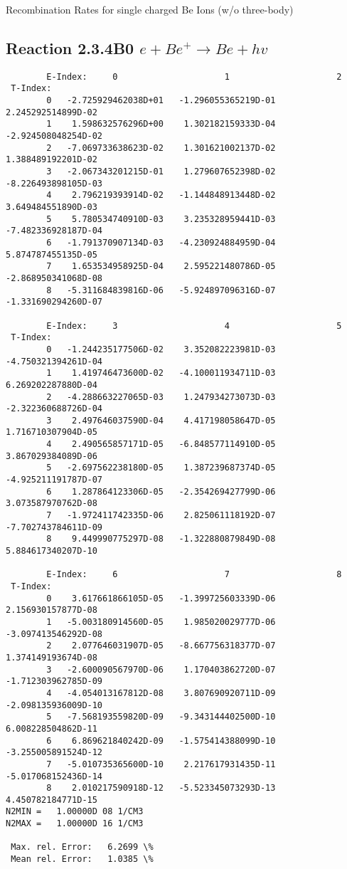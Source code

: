 \documentclass[12pt,dvipdfmx]{article}
\begin{document}
  Recombination Rates for single charged Be Ions (w/o three-body)

\subsection{
Reaction 2.3.4B0  $e + Be^+ \rightarrow Be + hv$
}


\begin{small}\begin{verbatim}
        E-Index:     0                     1                     2
 T-Index:
        0   -2.725929462038D+01   -1.296055365219D-01    2.245292514899D-02
        1    1.598632576296D+00    1.302182159333D-04   -2.924508048254D-02
        2   -7.069733638623D-02    1.301621002137D-02    1.388489192201D-02
        3   -2.067343201215D-01    1.279607652398D-02   -8.226493898105D-03
        4    2.796219393914D-02   -1.144848913448D-02    3.649484551890D-03
        5    5.780534740910D-03    3.235328959441D-03   -7.482336928187D-04
        6   -1.791370907134D-03   -4.230924884959D-04    5.874787455135D-05
        7    1.653534958925D-04    2.595221480786D-05   -2.868950341068D-08
        8   -5.311684839816D-06   -5.924897096316D-07   -1.331690294260D-07

        E-Index:     3                     4                     5
 T-Index:
        0   -1.244235177506D-02    3.352082223981D-03   -4.750321394261D-04
        1    1.419746473600D-02   -4.100011934711D-03    6.269202287880D-04
        2   -4.288663227065D-03    1.247934273073D-03   -2.322360688726D-04
        3    2.497646037590D-04    4.417198058647D-05    1.716710307904D-05
        4    2.490565857171D-05   -6.848577114910D-05    3.867029384089D-06
        5   -2.697562238180D-05    1.387239687374D-05   -4.925211191787D-07
        6    1.287864123306D-05   -2.354269427799D-06    3.073587970762D-08
        7   -1.972411742335D-06    2.825061118192D-07   -7.702743784611D-09
        8    9.449990775297D-08   -1.322880879849D-08    5.884617340207D-10

        E-Index:     6                     7                     8
 T-Index:
        0    3.617661866105D-05   -1.399725603339D-06    2.156930157877D-08
        1   -5.003180914560D-05    1.985020029777D-06   -3.097413546292D-08
        2    2.077646031907D-05   -8.667756318377D-07    1.374149193674D-08
        3   -2.600090567970D-06    1.170403862720D-07   -1.712303962785D-09
        4   -4.054013167812D-08    3.807690920711D-09   -2.098135936009D-10
        5   -7.568193559820D-09   -9.343144402500D-10    6.008228504862D-11
        6    6.869621840242D-09   -1.575414388099D-10   -3.255005891524D-12
        7   -5.010735365600D-10    2.217617931435D-11   -5.017068152436D-14
        8    2.010217590918D-12   -5.523345073293D-13    4.450782184771D-15
N2MIN =   1.00000D 08 1/CM3
N2MAX =   1.00000D 16 1/CM3

 Max. rel. Error:   6.2699 \%
 Mean rel. Error:   1.0385 \%

\end{verbatim}\end{small}
\end{document}
